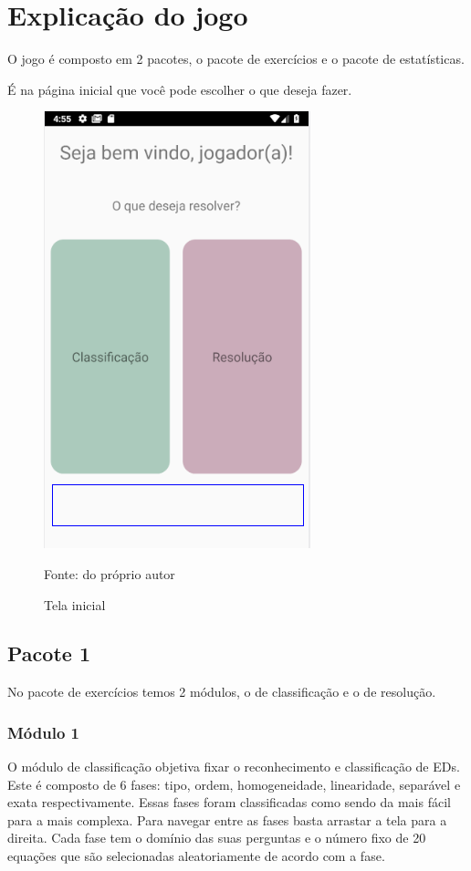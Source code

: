 \chapter[Explicação do jogo]{Explicação do jogo}
O jogo é composto em 2 pacotes, o pacote de exercícios e o pacote de estatísticas.

É na página inicial que você pode escolher o que deseja fazer.

\begin{figure}[H]
\centering
\caption{Tela inicial}
\includegraphics[scale=0.72]{figuras/tela_inicial.png}

\small{Fonte: do próprio autor}
\end{figure}


\section[Pacote 1]{Pacote 1}
No pacote de exercícios temos 2 módulos, o de classificação e o de resolução.

\subsection[Módulo 1]{Módulo 1}
O módulo de classificação objetiva fixar o reconhecimento e classificação de EDs. Este é composto de 6 fases: tipo, ordem, homogeneidade, linearidade, separável e exata respectivamente. Essas fases foram classificadas como sendo da mais fácil para a mais complexa. Para navegar entre as fases basta arrastar a tela para a direita.
Cada fase tem o domínio das suas perguntas e o número fixo de 20 equações que são selecionadas aleatoriamente de acordo com a fase.

